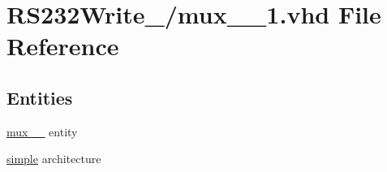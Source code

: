 \hypertarget{mux__2__1_8vhd}{}\section{R\+S232\+Write\+\_/mux\+\_\+\_\+1.vhd File Reference}
\label{mux__2__1_8vhd}
\subsection*{Entities}
\begin{DoxyCompactItemize}
\item 
\hyperlink{classmux__2__1}{mux\+\_\+\_} entity
\item 
\hyperlink{classmux__2__1_1_1simple}{simple} architecture
\end{DoxyCompactItemize}
